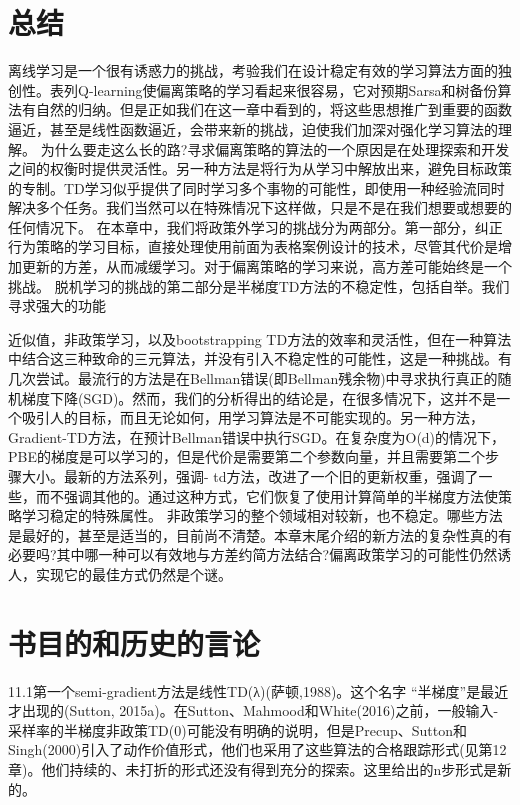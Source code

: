 \section{总结}

离线学习是一个很有诱惑力的挑战，考验我们在设计稳定有效的学习算法方面的独创性。表列Q-learning使偏离策略的学习看起来很容易，它对预期Sarsa和树备份算法有自然的归纳。但是正如我们在这一章中看到的，将这些思想推广到重要的函数逼近，甚至是线性函数逼近，会带来新的挑战，迫使我们加深对强化学习算法的理解。
为什么要走这么长的路?寻求偏离策略的算法的一个原因是在处理探索和开发之间的权衡时提供灵活性。另一种方法是将行为从学习中解放出来，避免目标政策的专制。TD学习似乎提供了同时学习多个事物的可能性，即使用一种经验流同时解决多个任务。我们当然可以在特殊情况下这样做，只是不是在我们想要或想要的任何情况下。
在本章中，我们将政策外学习的挑战分为两部分。第一部分，纠正行为策略的学习目标，直接处理使用前面为表格案例设计的技术，尽管其代价是增加更新的方差，从而减缓学习。对于偏离策略的学习来说，高方差可能始终是一个挑战。
脱机学习的挑战的第二部分是半梯度TD方法的不稳定性，包括自举。我们寻求强大的功能

近似值，非政策学习，以及bootstrapping TD方法的效率和灵活性，但在一种算法中结合这三种致命的三元算法，并没有引入不稳定性的可能性，这是一种挑战。有几次尝试。最流行的方法是在Bellman错误(即Bellman残余物)中寻求执行真正的随机梯度下降(SGD)。然而，我们的分析得出的结论是，在很多情况下，这并不是一个吸引人的目标，而且无论如何，用学习算法是不可能实现的。另一种方法，Gradient-TD方法，在预计Bellman错误中执行SGD。在复杂度为O(d)的情况下，PBE的梯度是可以学习的，但是代价是需要第二个参数向量，并且需要第二个步骤大小。最新的方法系列，强调- td方法，改进了一个旧的更新权重，强调了一些，而不强调其他的。通过这种方式，它们恢复了使用计算简单的半梯度方法使策略学习稳定的特殊属性。
非政策学习的整个领域相对较新，也不稳定。哪些方法是最好的，甚至是适当的，目前尚不清楚。本章末尾介绍的新方法的复杂性真的有必要吗?其中哪一种可以有效地与方差约简方法结合?偏离政策学习的可能性仍然诱人，实现它的最佳方式仍然是个谜。


\section{书目的和历史的言论}

11.1第一个semi-gradient方法是线性TD(λ)(萨顿,1988)。这个名字
“半梯度”是最近才出现的(Sutton, 2015a)。在Sutton、Mahmood和White(2016)之前，一般输入-采样率的半梯度非政策TD(0)可能没有明确的说明，但是Precup、Sutton和Singh(2000)引入了动作价值形式，他们也采用了这些算法的合格跟踪形式(见第12章)。他们持续的、未打折的形式还没有得到充分的探索。这里给出的n步形式是新的。

